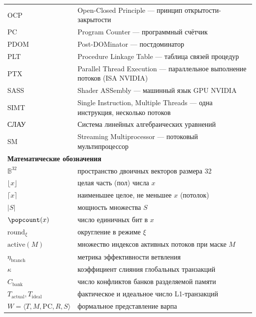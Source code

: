 \begin{longtable}{p{4cm} p{11cm}}
OCP    & Open-Closed Principle --- принцип открытости-закрытости \\
PC     & Program Counter --- программный счётчик \\
PDOM   & Post-DOMinator --- постдоминатор \\
PLT    & Procedure Linkage Table --- таблица связей процедур \\
PTX    & Parallel Thread Execution --- параллельное выполнение потоков (ISA NVIDIA) \\
SASS   & Shader ASSembly --- машинный язык GPU NVIDIA \\
SIMT   & Single Instruction, Multiple Threads --- одна инструкция, несколько потоков \\
СЛАУ   & Система линейных алгебраических уравнений \\
SM     & Streaming Multiprocessor --- потоковый мультипроцессор \\
\midrule
\multicolumn{2}{l}{\textbf{Математические обозначения}} \\
\midrule
$\mathbb{B}^{32}$ & пространство двоичных векторов размера 32 \\
$\lfloor x \rfloor$ & целая часть (пол) числа $x$ \\
$\lceil x \rceil$  & наименьшее целое, не меньшее $x$ (потолок) \\
$|S|$              & мощность множества $S$ \\
$\popcount(x)$     & число единичных бит в $x$ \\
$\mathrm{round}_\xi$ & округление в режиме $\xi$ \\
$\mathrm{active}(M)$ & множество индексов активных потоков при маске $M$ \\
$\eta_{\mathrm{branch}}$ & метрика эффективности ветвления \\
$\kappa$           & коэффициент слияния глобальных транзакций \\
$C_{\mathrm{bank}}$ & число конфликтов банков разделяемой памяти \\
$T_{\mathrm{actual}}, T_{\mathrm{ideal}}$ & фактическое и идеальное число L1-транзакций \\
$W = \langle T, M, \mathrm{PC}, R, S \rangle$ & формальное представление варпа \\
\end{longtable}

\newpage
